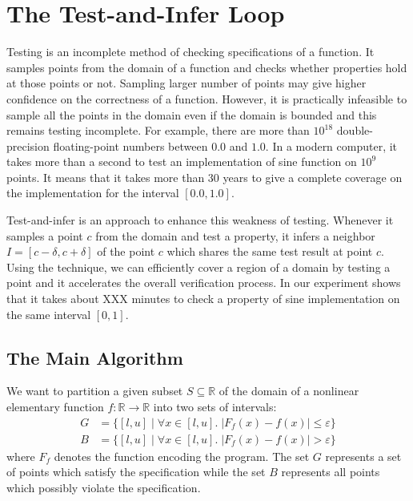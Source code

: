 \section{The Test-and-Infer Loop}

Testing is an incomplete method of checking specifications of a
function. It samples points from the domain of a function and checks
whether properties hold at those points or not. Sampling larger number
of points may give higher confidence on the correctness of a function.
However, it is practically infeasible to sample all the points in the
domain even if the domain is bounded and this remains testing
incomplete. For example, there are more than $10^{18}$ double-precision
floating-point numbers between $0.0$ and $1.0$. In a modern computer,
it takes more than a second to test an implementation of sine function
on $10^9$ points. It means that it takes more than 30 years to give a
complete coverage on the implementation for the interval $[0.0, 1.0]$.

Test-and-infer is an approach to enhance this weakness of testing.
Whenever it samples a point $c$ from the domain and test a property,
it infers a neighbor $I = [c - \delta, c + \delta]$ of the point $c$
which shares the same test result at point $c$. Using the technique,
we can efficiently cover a region of a domain by testing a point and
it accelerates the overall verification process. In our experiment
shows that it takes about XXX minutes to check a property of sine
implementation on the same interval $[0, 1]$.

\subsection{The Main Algorithm}
We want to partition a given subset $S \subseteq \mathbb{R}$ of the
domain of a nonlinear elementary function $f : \mathbb{R} \to
\mathbb{R}$ into two sets of intervals:
\begin{align*}
  G & = \{ [l, u] \mid \forall x \in [l, u]. \; | F_f(x) - f(x) | \le \varepsilon \}\\
  B & = \{ [l, u] \mid \forall x \in [l, u]. \; | F_f(x) - f(x) | > \varepsilon \}
\end{align*}
where $F_f$ denotes the function encoding the program. The set $G$
represents a set of points which satisfy the specification while the
set $B$ represents all points which possibly violate the
specification.

